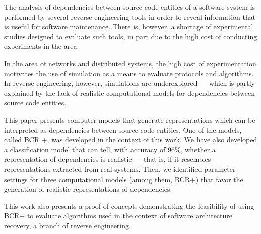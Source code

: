 
The analysis of dependencies between source code entities of a software system is performed by several reverse engineering tools in order to reveal information that is useful for software maintenance. There is, however, a shortage of experimental studies designed to evaluate such tools, in part due to the high cost of conducting experiments in the area.

In the area of networks and distributed systems, the high cost of experimentation motivates the use of simulation as a means to evaluate protocols and algorithms. In reverse engineering, however, simulations are underexplored --- which is partly explained by the lack of realistic computational models for dependencies between source code entities.

This paper presents computer models that generate representations which can be interpreted as dependencies between source code entities. One of the models, called BCR +, was developed in the context of this work. We have also developed a classification model that can tell, with accuracy of 96\%, whether a representation of dependencies is realistic --- that is, if it resembles representations extracted from real systems. Then, we identified parameter settings for three computational models (among them, BCR+) that favor the generation of realistic representations of dependencies.


This work also presents a proof of concept, demonstrating the feasibility of using BCR+ to evaluate algorithms used in the context of software architecture recovery, a branch of reverse engineering.
